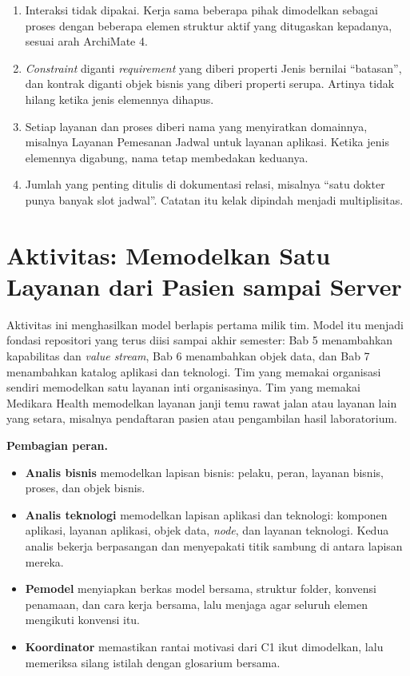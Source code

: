 \begin{enumerate}
  \item Interaksi tidak dipakai. Kerja sama beberapa pihak dimodelkan sebagai
        proses dengan beberapa elemen struktur aktif yang ditugaskan
        kepadanya, sesuai arah ArchiMate 4.
  \item \textit{Constraint} diganti \textit{requirement} yang diberi properti
        Jenis bernilai ``batasan'', dan kontrak diganti objek bisnis yang
        diberi properti serupa. Artinya tidak hilang ketika jenis elemennya
        dihapus.
  \item Setiap layanan dan proses diberi nama yang menyiratkan domainnya,
        misalnya Layanan Pemesanan Jadwal untuk layanan aplikasi. Ketika
        jenis elemennya digabung, nama tetap membedakan keduanya.
  \item Jumlah yang penting ditulis di dokumentasi relasi, misalnya ``satu
        dokter punya banyak slot jadwal''. Catatan itu kelak dipindah menjadi
        multiplisitas.
\end{enumerate}

\section{Aktivitas: Memodelkan Satu Layanan dari Pasien sampai Server}

Aktivitas ini menghasilkan model berlapis pertama milik tim. Model itu
menjadi fondasi repositori yang terus diisi sampai akhir semester: Bab 5
menambahkan kapabilitas dan \textit{value stream}, Bab 6 menambahkan objek
data, dan Bab 7 menambahkan katalog aplikasi dan teknologi. Tim yang memakai
organisasi sendiri memodelkan satu layanan inti organisasinya. Tim yang
memakai Medikara Health memodelkan layanan janji temu rawat jalan atau layanan
lain yang setara, misalnya pendaftaran pasien atau pengambilan hasil
laboratorium.

\textbf{Pembagian peran.}

\begin{itemize}
  \item \textbf{Analis bisnis} memodelkan lapisan bisnis: pelaku, peran,
        layanan bisnis, proses, dan objek bisnis.
  \item \textbf{Analis teknologi} memodelkan lapisan aplikasi dan teknologi:
        komponen aplikasi, layanan aplikasi, objek data, \textit{node}, dan
        layanan teknologi. Kedua analis bekerja berpasangan dan menyepakati
        titik sambung di antara lapisan mereka.
  \item \textbf{Pemodel} menyiapkan berkas model bersama, struktur folder,
        konvensi penamaan, dan cara kerja bersama, lalu menjaga agar seluruh
        elemen mengikuti konvensi itu.
  \item \textbf{Koordinator} memastikan rantai motivasi dari C1 ikut
        dimodelkan, lalu memeriksa silang istilah dengan glosarium bersama.
\end{itemize}


